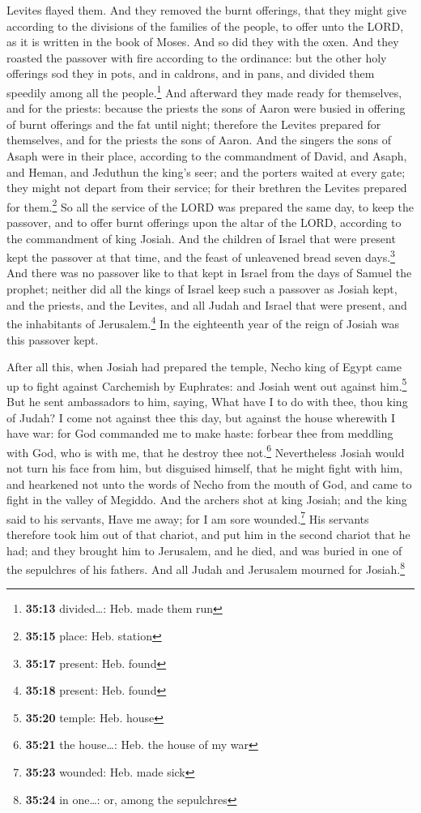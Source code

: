 Levites flayed them.  And they removed the burnt
offerings, that they might give according to the divisions of the
families of the people, to offer unto the LORD, as it is written in the
book of Moses. And so did they with the oxen.  And they
roasted the passover with fire according to the ordinance: but the other
holy offerings sod they in pots, and in caldrons, and in pans, and
divided them speedily among all the people.\footnote{\textbf{35:13}
  divided\ldots: Heb. made them run}  And afterward they
made ready for themselves, and for the priests: because the priests the
sons of Aaron were busied in offering of burnt offerings and the fat
until night; therefore the Levites prepared for themselves, and for the
priests the sons of Aaron.  And the singers the sons of
Asaph were in their place, according to the commandment of David, and
Asaph, and Heman, and Jeduthun the king's seer; and the porters waited
at every gate; they might not depart from their service; for their
brethren the Levites prepared for them.\footnote{\textbf{35:15} place:
  Heb. station}  So all the service of the LORD was
prepared the same day, to keep the passover, and to offer burnt
offerings upon the altar of the LORD, according to the commandment of
king Josiah.  And the children of Israel that were
present kept the passover at that time, and the feast of unleavened
bread seven days.\footnote{\textbf{35:17} present: Heb. found}
 And there was no passover like to that kept in Israel
from the days of Samuel the prophet; neither did all the kings of Israel
keep such a passover as Josiah kept, and the priests, and the Levites,
and all Judah and Israel that were present, and the inhabitants of
Jerusalem.\footnote{\textbf{35:18} present: Heb. found} 
In the eighteenth year of the reign of Josiah was this passover kept.

 After all this, when Josiah had prepared the temple,
Necho king of Egypt came up to fight against Carchemish by Euphrates:
and Josiah went out against him.\footnote{\textbf{35:20} temple: Heb.
  house}  But he sent ambassadors to him, saying, What
have I to do with thee, thou king of Judah? I come not against thee this
day, but against the house wherewith I have war: for God commanded me to
make haste: forbear thee from meddling with God, who is with me, that he
destroy thee not.\footnote{\textbf{35:21} the house\ldots: Heb. the
  house of my war}  Nevertheless Josiah would not turn
his face from him, but disguised himself, that he might fight with him,
and hearkened not unto the words of Necho from the mouth of God, and
came to fight in the valley of Megiddo.  And the archers
shot at king Josiah; and the king said to his servants, Have me away;
for I am sore wounded.\footnote{\textbf{35:23} wounded: Heb. made sick}
 His servants therefore took him out of that chariot, and
put him in the second chariot that he had; and they brought him to
Jerusalem, and he died, and was buried in one of the sepulchres of his
fathers. And all Judah and Jerusalem mourned for Josiah.\footnote{\textbf{35:24}
  in one\ldots: or, among the sepulchres}

